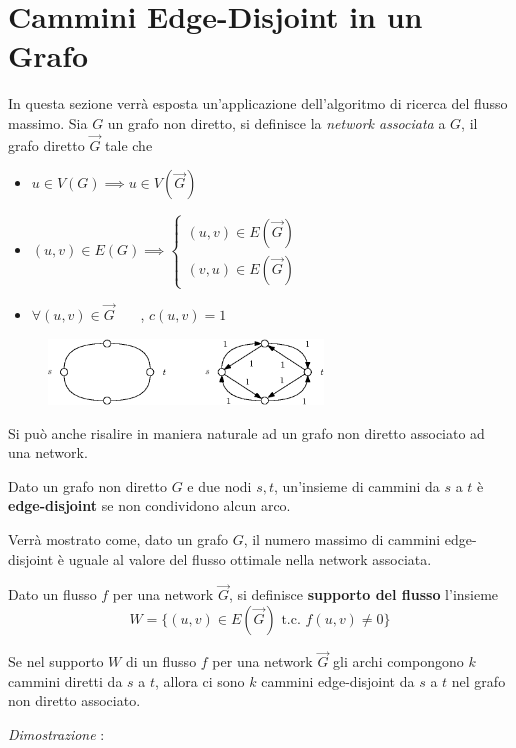\documentclass[10pt, letterpaper]{report}
\begin{document}
\section{Cammini Edge-Disjoint in un Grafo}
In questa sezione verrà esposta un'applicazione dell'algoritmo di ricerca del flusso massimo. Sia $G$ un grafo non diretto, si definisce la \textit{network associata} a $G$, il grafo diretto $\vec G$ tale che\begin{itemize}
    \item $u\in V(G)\implies u\in V(\vec G)$
    \item $(u,v)\in E(G)\implies \begin{cases}
        (u,v)\in E(\vec G)\\ 
        (v,u)\in E(\vec G)
    \end{cases}$
    \item $\forall (u,v)\in \vec G$ \ \ \ , $c(u,v)=1$
\end{itemize}
\begin{figure}[h!]
    \centering 
    \includegraphics[width=0.65\textwidth ]{images/networkAssociata.eps}
\end{figure}
Si può anche risalire in maniera naturale ad un grafo non diretto associato ad una network.
\begin{definizione}
    Dato un grafo non diretto $G$ e due nodi $s,t$, un'insieme di cammini da $s$ a $t$ è \textbf{edge-disjoint} se non condividono alcun arco.
\end{definizione}
Verrà mostrato come, dato un grafo $G$, il numero massimo di cammini edge-disjoint è uguale al valore del flusso ottimale nella network associata.
\begin{definizione}
    Dato un flusso $f$ per una network $\vec G$, si definisce \textbf{supporto del flusso} l'insieme $$W=\{(u,v)\in E(\vec G) \text{ t.c. }f(u,v)\ne 0\} $$
\end{definizione}
\begin{proposizione}
    Se nel supporto $W$ di un flusso $f$ per una network $\vec G$ gli archi compongono $k$ cammini diretti da $s$ a $t$, allora ci sono $k$ cammini edge-disjoint da $s$ a $t$ nel grafo non diretto associato.
\end{proposizione}
\textit{Dimostrazione} : 
\end{document}
